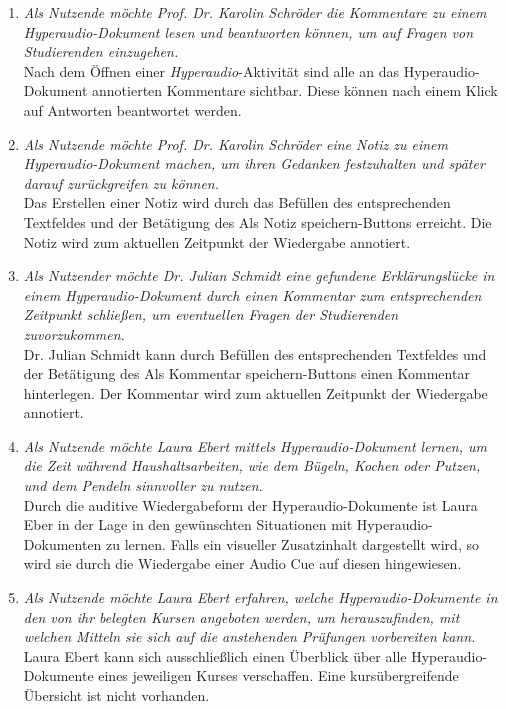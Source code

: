 \begin{enumerate}[label=US-\arabic*:,ref=US-\arabic*]
\item \label{US-Antwort-L-Eval} \textit{Als Nutzende möchte Prof. Dr. Karolin Schröder die Kommentare zu einem Hyperaudio-Dokument lesen und beantworten können, um auf Fragen von Studierenden einzugehen.}\\
Nach dem Öffnen einer \textit{Hyperaudio}-Aktivität sind alle an das Hyperaudio-Dokument annotierten Kommentare sichtbar. Diese können nach einem Klick auf \glqq Antworten\grqq{} beantwortet werden.

\item \label{US-Notiz-L-Eval} \textit{Als Nutzende möchte Prof. Dr. Karolin Schröder eine Notiz zu einem Hyperaudio-Dokument machen, um ihren Gedanken festzuhalten und später darauf zurückgreifen zu können.}\\
Das Erstellen einer Notiz wird durch das Befüllen des entsprechenden Textfeldes und der Betätigung des \glqq Als Notiz speichern\grqq{}-Buttons erreicht. Die Notiz wird zum aktuellen Zeitpunkt der Wiedergabe annotiert.


\item \label{US-Kommentar-L-Eval} \textit{Als Nutzender möchte Dr. Julian Schmidt eine gefundene Erklärungslücke in einem Hyperaudio-Dokument durch einen Kommentar zum entsprechenden Zeitpunkt schließen, um eventuellen Fragen der Studierenden zuvorzukommen.}\\
Dr. Julian Schmidt kann durch Befüllen des entsprechenden Textfeldes und der Betätigung des \glqq Als Kommentar speichern\grqq{}-Buttons einen Kommentar hinterlegen. Der Kommentar wird zum aktuellen Zeitpunkt der Wiedergabe annotiert.

\item \label{US-Zeit-Eval} \textit{Als Nutzende möchte Laura Ebert mittels Hyperaudio-Dokument lernen, um die Zeit während Haushaltsarbeiten, wie dem Bügeln, Kochen oder Putzen, und dem Pendeln sinnvoller zu nutzen.}\\
Durch die auditive Wiedergabeform der Hyperaudio-Dokumente ist Laura Eber in der Lage in den gewünschten Situationen mit Hyperaudio-Dokumenten zu lernen. Falls ein visueller Zusatzinhalt dargestellt wird, so wird sie durch die Wiedergabe einer Audio Cue auf diesen hingewiesen.

\item \label{US-Uebersicht-Kurse} \textit{Als Nutzende möchte Laura Ebert erfahren, welche Hyperaudio-Dokumente in den von ihr belegten Kursen angeboten werden, um herauszufinden, mit welchen Mitteln sie sich auf die anstehenden Prüfungen vorbereiten kann.}\\
Laura Ebert kann sich ausschließlich einen Überblick über alle Hyperaudio-Dokumente eines jeweiligen Kurses verschaffen. Eine kursübergreifende Übersicht ist nicht vorhanden.


\end{enumerate}
